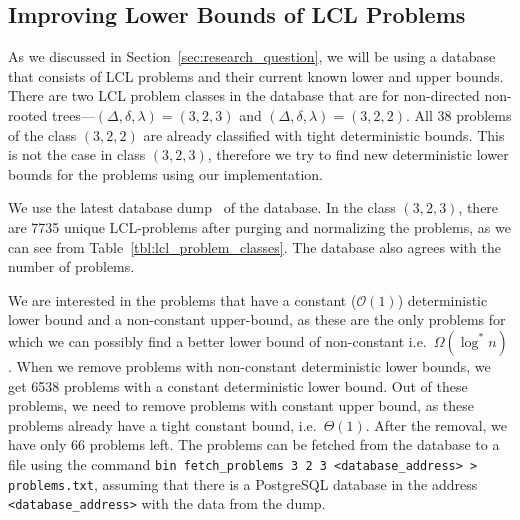 %
%
\subsection{Improving Lower Bounds of LCL Problems}\label{sec:results:improving_bounds}
As we discussed in Section~\ref{sec:research_question}, we will be using a database~\cite{Tereshchenko2021,LclClassifierAalto,LclClassifierGithub} that consists of LCL problems and their current known lower and upper bounds.
There are two LCL problem classes in the database that are for non-directed non-rooted trees---$(\Delta, \delta, \lambda) = (3,2,3)$ and $(\Delta, \delta, \lambda) = (3,2,2)$.
All 38 problems of the class $(3,2,2)$ are already classified with tight deterministic bounds.
This is not the case in class $(3,2,3)$, therefore we try to find new deterministic lower bounds for the problems using our implementation.

We use the latest database dump~\cite{DatabaseDump} of the database.
In the class $(3,2,3)$, there are 7735 unique LCL-problems after purging and normalizing the problems, as we can see from Table~\ref{tbl:lcl_problem_classes}.
The database also agrees with the number of problems.

We are interested in the problems that have a constant ($\mathcal{O}(1)$) deterministic lower bound and a non-constant upper-bound, as these are the only problems for which we can possibly find a better lower bound of non-constant i.e.\ $\Omega(\log^*n)$.
When we remove problems with non-constant deterministic lower bounds, we get 6538 problems with a constant deterministic lower bound.
Out of these problems, we need to remove problems with constant upper bound, as these problems already have a tight constant bound, i.e.\ $\Theta(1)$.
After the removal, we have only 66 problems left.
The problems can be fetched from the database to a file  using the command \verb|bin fetch_problems 3 2 3 <database_address> > problems.txt|, assuming that there is a PostgreSQL database in the address \verb|<database_address>| with the data from the dump.


